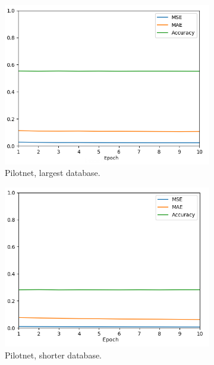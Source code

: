 \documentclass[conference]{IEEEtran}
\begin{document}
\begin{figure}[h]
	\centering
	\begin{subfigure}{0.24\textwidth} 
		\includegraphics[width=\textwidth]{img/pilotnet1}
		\caption{Pilotnet, largest database.} 
		\label{subfig:1}
	\end{subfigure}
	\begin{subfigure}{0.24\textwidth} 
		\includegraphics[width=\textwidth]{img/pilotnet2}
		\caption{Pilotnet, shorter database.} 
		\label{subfig:2}
	\end{subfigure}
	\begin{subfigure}{0.24\textwidth} 

\end{subfigure}
\end{figure}
\end{document}
